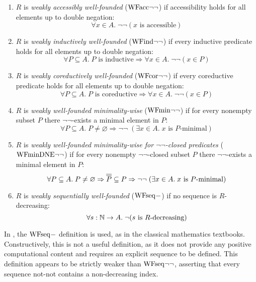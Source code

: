 \begin{definition} \label{def:WFweakproperties} \hfill
  \begin{enumerate}
    \item $R$ is \emph{weakly accessibly well-founded} ($\mathrm{WFacc}{\lnot\lnot}$) if accessibility holds for all elements up to double negation:
      \[
        \forall x \in A.\; \lnot \lnot  (x \text{ is accessible})
      \]
    \item $R$ is \emph{weakly inductively well-founded} ($\mathrm{WFind}{\lnot\lnot}$) if every inductive predicate holds for all elements up to double negation:
      \[
        \forall P \subseteq A.\;\text{$P$ is inductive} \Rightarrow \forall x \in A.\; \lnot \lnot (x \in P)
      \]
    \item $R$ is \emph{weakly coreductively well-founded} ($\mathrm{WFcor}{\lnot\lnot}$) if every coreductive predicate holds for all elements up to double negation:
      \[
        \forall P \subseteq A.\;\text{$P$ is coreductive} \Rightarrow \forall x \in A.\; \lnot\lnot(x \in P)
      \]
    \item  $R$ is \emph{weakly well-founded minimality-wise} ($\mathrm{WFmin}{\lnot\lnot}$)
      if for every nonempty subset $P$ there $\lnot \lnot$-exists a minimal element in $P$:
      \[
        \forall P \subseteq A.\; P \neq \varnothing \Rightarrow \lnot \lnot \;
        (\exists x \in A.\; \text{$x$ is $P$-minimal})
      \]
    \item  $R$ is \emph{weakly well-founded minimality-wise for $\lnot \lnot$-closed predicates} ($\mathrm{WFminDNE}{\lnot\lnot}$)
      if for every nonempty $\lnot \lnot$-closed subset $P$ there $\lnot \lnot$-exists a minimal element in $P$:
      \[
        \forall P \subseteq A.\; P \neq \varnothing \Rightarrow \overline{\overline{P}} \subseteq P\Rightarrow \lnot \lnot \;
        (\exists x \in A.\; \text{$x$ is $P$-minimal})
      \]
  \item $R$ is \emph{weakly sequentially well-founded} ($\mathrm{WFseq}{-}$) if no sequence is $R$-decreasing:
    \[
      \forall s:\mathbb{N} \to A.\; \lnot \text{($s$ is $R$-decreasing)}
    \]
\end{enumerate}
\end{definition}

In \cite{Terese}, the $\mathrm{WFseq}{-}$ definition is used, as in the classical mathematics textbooks. Constructively, this is not a useful definition, as it does not provide any positive computational content and requires an explicit sequence to be defined.  This definition appears to be strictly weaker than
$\mathrm{WFseq}{\lnot\lnot}$, asserting that every sequence not-not contains a
non-decreasing index.


